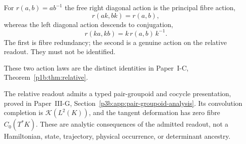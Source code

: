 \documentclass[12pt,a4paper]{article}
\begin{document}
\begin{remark}
\label{p3b:rem:v193-diagonal-action-typing}
For \(r(a,b)=ab^{-1}\) the free right diagonal action is the principal fibre
action,
\[
 r(ak,bk)=r(a,b),
\]
whereas the left diagonal action descends to conjugation,
\[
 r(ka,kb)=k\,r(a,b)\,k^{-1}.
\]
The first is fibre redundancy; the second is a genuine action on the relative
readout.  They must not be identified.
\end{remark}

These two action laws are the distinct identities in Paper~I-C,
Theorem~\ref{p1b:thm:relative}.

\begin{remark}
The relative readout admits a typed pair-groupoid and cocycle presentation,
proved in Paper~III-G, Section~\ref{p3b:app:pair-groupoid-analysis}.  Its convolution
completion is \(\mathcal K(L^2(K))\), and the tangent deformation has zero
fibre \(C_0(T^*K)\).  These are analytic consequences of the admitted
readout, not a Hamiltonian, state, trajectory, physical occurrence, or
determinant ancestry.
\end{remark}
\end{document}
